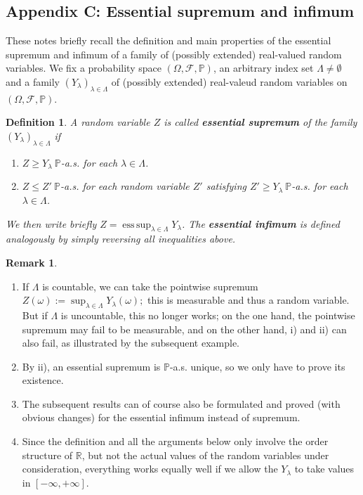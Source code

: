 \documentclass[12pt,a4paper, twoside]{article}
\newtheorem{defn}{Definition}[section]
\theoremstyle{definition}
\newtheorem{rem}{Remark}[section]
\newcommand{\PP}{\mathbb{P}} %
\DeclareMathOperator*{\esssup}{ess\,sup}
\begin{document}
\subsection{Appendix C: Essential supremum and infimum}
These notes briefly recall the definition and main properties of the essential supremum and infimum of a family of (possibly extended) real-valued random variables. We fix a probability space $(\Omega, \mathcal{F},  \PP)$, an arbitrary index set $\Lambda \neq \emptyset$ and a family $(Y_\lambda)_{\lambda \in \Lambda}$ of (possibly extended) real-valeud random variables on $(\Omega,  \mathcal{F},  \PP)$.
\begin{defn} A random variable $Z$ is called \textbf{essential supremum} of the family $(Y_\lambda)_{\lambda \in \Lambda}$ if 
\begin{enumerate}
\item[i)] $Z \geq Y_\lambda \ \PP$-a.s. for each $\lambda \in \Lambda$. 
\item[ii)] $Z \leq Z' \ \PP$-a.s. for each random variable $Z'$ satisfying $Z' \geq Y_\lambda \ \PP$-a.s. for each $\lambda \in \Lambda$. 
\end{enumerate}
We then write briefly $Z=\esssup_{\lambda \in \Lambda} Y_\lambda$. The \textbf{essential infimum} is defined analogously by simply reversing all inequalities above. 
\end{defn}
\begin{rem} \
\begin{enumerate}
\item If $\Lambda$ is countable, we can take the pointwise supremum $Z(\omega):= \sup_{ \lambda \in \Lambda} Y_\lambda(\omega);$ this is measurable and thus a random variable. But if $\Lambda$ is uncountable, this no longer works; on the one hand, the pointwise supremum may fail to be measurable, and on the other hand, i) and ii) can also fail, as illustrated by the subsequent example. 
\item By ii), an essential supremum is $\PP$-a.s. unique, so we only have to prove its existence.
\item The subsequent results can of course also be formulated and proved (with obvious changes) for the essential infimum instead of supremum.
\item Since the definition and all the arguments below only involve the order structure of $\mathbb{R}$, but not the actual values of the random variables under consideration, everything works equally well if we allow the $Y_\lambda$ to take values in $[- \infty,  + \infty]$. 
\end{enumerate}
\end{rem}
\end{document}
